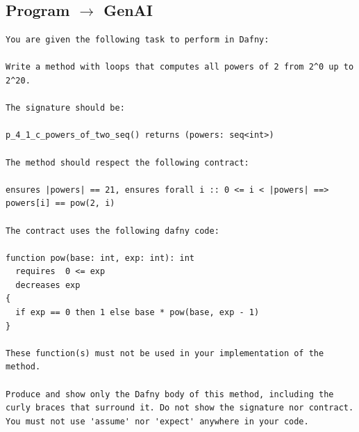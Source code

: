 \documentclass{article}
\begin{document}
\subsection*{Program $\rightarrow$ GenAI}
\begin{lstlisting}
You are given the following task to perform in Dafny:

Write a method with loops that computes all powers of 2 from 2^0 up to 2^20.

The signature should be:

p_4_1_c_powers_of_two_seq() returns (powers: seq<int>)

The method should respect the following contract:

ensures |powers| == 21, ensures forall i :: 0 <= i < |powers| ==> powers[i] == pow(2, i)

The contract uses the following dafny code:

function pow(base: int, exp: int): int
  requires  0 <= exp
  decreases exp
{
  if exp == 0 then 1 else base * pow(base, exp - 1)
}

These function(s) must not be used in your implementation of the method.

Produce and show only the Dafny body of this method, including the curly braces that surround it. Do not show the signature nor contract. You must not use 'assume' nor 'expect' anywhere in your code.
\end{lstlisting}
\end{document}
